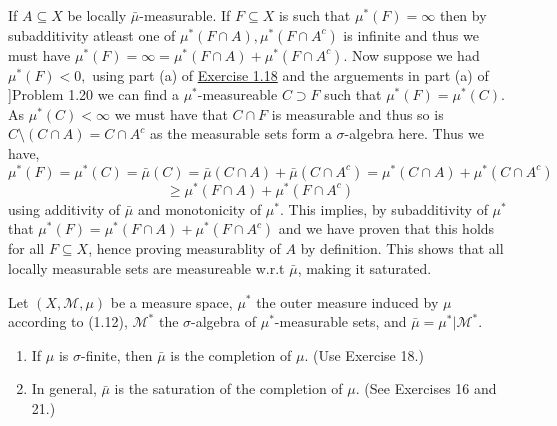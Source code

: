 \documentclass[12pt,a4paper]{article}
\begin{document}
\begin{solution}
    If $A\subseteq X$ be locally $\bar{\mu}$-measurable. 
    If $F\subseteq X$ is such that $\mu^*(F)=\infty$ then by subadditivity atleast one of $\mu^*(F\cap A),\mu^*(F\cap A^c)$ is infinite and thus we must have $\mu^*(F)=\infty=\mu^*(F\cap A)+\mu^*(F\cap A^c)$. 
    Now suppose we had $\mu^*(F)<0,$ using part (a) of \hyperref[prob:1-18]{Exercise 1.18} and the arguements in part (a) of \hyperref[prob:1-20]]{Problem 1.20} we can find a $\mu^*$-measureable $C\supset F$ such that $\mu^*(F)=\mu^*(C)$.
    As $\mu^*(C)<\infty$ we must have that $C\cap F$ is measurable and thus so is $C\setminus(C\cap A)=C\cap A^c$ as the measurable sets form a $\sigma$-algebra here. 
    Thus we have,
    $$\mu^*(F)=\mu^*(C)=\bar{\mu}(C)=\bar{\mu}(C\cap A)+\bar{\mu}(C\cap A^c)=\mu^*(C\cap A)+\mu^*(C\cap A^c)$$
    $$\geq\mu^*(F\cap A)+\mu^*(F\cap A^c)$$
    using additivity of $\bar{\mu}$ and monotonicity of $\mu^*$.
    This implies, by subadditivity of $\mu^*$ that $\mu^*(F)=\mu^*(F\cap A)+\mu^*(F\cap A^c)$ and we have proven that this holds for all $F\subseteq X$, hence proving measurablity of $A$ by definition. 
    This shows that all locally measurable sets are measureable w.r.t $\bar{\mu}$, making it saturated. 
\end{solution}
\begin{problem}\label{prob:1-22}
Let $(X, \mathcal{M}, \mu)$ be a measure space, $\mu^*$ the outer measure induced by $\mu$ according to (1.12), $\mathcal{M}^*$ the $\sigma$-algebra of $\mu^*$-measurable sets, and $\bar{\mu} = \mu^*|\mathcal{M}^*$.
\begin{enumerate}[label=\alph*.]
    \item If $\mu$ is $\sigma$-finite, then $\bar{\mu}$ is the completion of $\mu$. (Use Exercise 18.)
    \item In general, $\bar{\mu}$ is the saturation of the completion of $\mu$. (See Exercises 16 and 21.)
\end{enumerate}
\end{problem}
\end{document}
